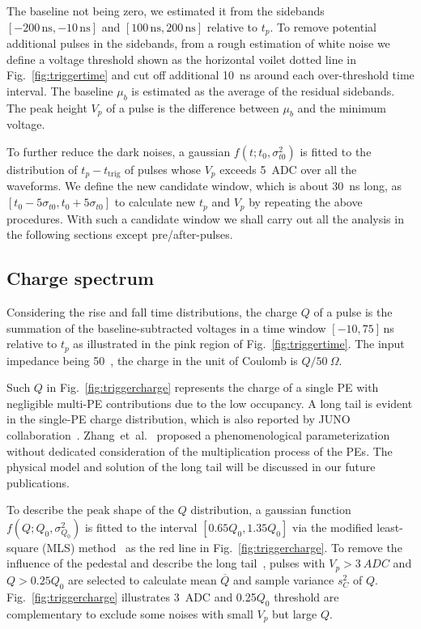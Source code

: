The baseline not being zero, we estimated it from the sidebands $[-200\,\mathrm{ns},-10\,\mathrm{ns}]$ and $[100\,\mathrm{ns},200\,\mathrm{ns}]$ relative to $t_p$. To remove potential additional pulses in the sidebands, from a rough estimation of white noise we define a voltage threshold shown as the horizontal voilet dotted line in Fig.~\ref{fig:triggertime} and cut off additional \SI{10}{ns} around each over-threshold time interval. The baseline $\mu_b$ is estimated as the average of the residual sidebands. The peak height $V_p$ of a pulse is the difference between $\mu_b$ and the minimum voltage.

To further reduce the dark noises, a gaussian $f(t;t_0,\sigma_{t0}^2)$ is fitted to the distribution of $t_p-t_{\mathrm{trig}}$ of pulses whose $V_p$ exceeds \SI{5}{ADC} over all the waveforms. We define the new candidate window, which is about \SI{30}{ns} long, as $[t_0-5\sigma_{t0}, t_0+5\sigma_{t0}]$ to calculate new $t_p$ and $V_p$ by repeating the above procedures. With such a candidate window we shall carry out all the analysis in the following sections except pre/after-pulses.

\subsection{Charge spectrum}
\label{sec:noisepeak}

Considering the rise and fall time distributions, the charge $Q$ of a pulse is the summation of the baseline-subtracted voltages in a time window $[-10, 75]$\,ns relative to $t_p$ as illustrated in the pink region of Fig.~\ref{fig:triggertime}. The input impedance being \SI{50}{\Omega}~\cite{CAENV1751}, the charge in the unit of Coulomb is $Q/\SI{50}{\Omega}$.

Such $Q$ in Fig.~\ref{fig:triggercharge} represents the charge of a single PE with negligible multi-PE contributions due to the low occupancy. A long tail is evident in the single-PE charge distribution, which is also reported by JUNO collaboration~\cite{JUNOMassTesting}. Zhang~et~al.~\cite{JUNOLongtail} proposed a phenomenological parameterization without dedicated consideration of the multiplication process of the PEs. The physical model and solution of the long tail will be discussed in our future publications.

To describe the peak shape of the $Q$ distribution, a gaussian function $f(Q;Q_0,\sigma^2_{Q_0})$ is fitted to the interval $[0.65Q_0, 1.35Q_0]$ via the modified least-square (MLS) method~\cite{Cowan1998StatisticalDA} as the red line in Fig.~\ref{fig:triggercharge}. To remove the influence of the pedestal and describe the long tail~\cite{JUNOLongtail}, pulses with $V_p>\SI{3}{ADC}$ and $Q>0.25Q_0$ are selected to calculate mean $\overline{Q}$ and sample variance $s^2_{C}$ of $Q$.
Fig.~\ref{fig:triggercharge} illustrates \SI{3}{ADC} and 0.25$Q_0$ threshold are complementary to exclude some noises with small $V_p$ but large $Q$.

